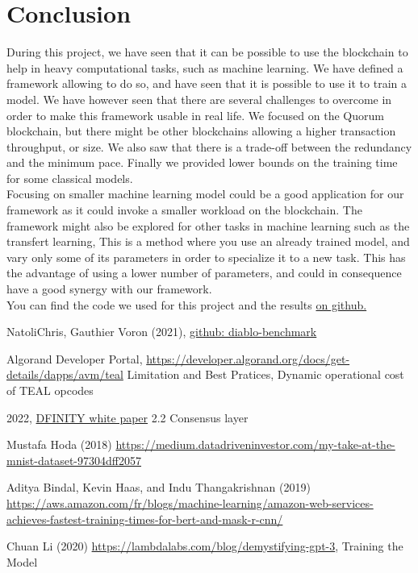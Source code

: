 \documentclass{article}
\begin{document}
\section{Conclusion}
During this project, we have seen that it can be possible to use the blockchain to help in heavy computational tasks, such as
machine learning. We have defined a framework allowing to do so, and have seen that it is possible to use it to train a model.
We have however seen that there are several challenges to overcome in order to make this framework usable in real life.
We focused on the Quorum blockchain, but there might be other blockchains allowing a higher transaction throughput, or size.
We also saw that there is a trade-off between the redundancy and the minimum pace. Finally we provided lower bounds
on the training time for some classical models.\\
Focusing on smaller machine learning model could be a good application for our framework as it could invoke a smaller workload
on the blockchain. The framework might also be explored for other tasks in machine learning such as the transfert learning, This is a method where
you use an already trained model, and vary only some of its parameters in order to specialize it to a new task. This has the
advantage of using a lower number of parameters, and could in consequence have a good synergy with our framework.\\
You can find the code we used for this project and the results \href{https://github.com/douglasbouchet/ml_on_blockchain}{on github.}


\newpage
\begin{thebibliography}{9}

    NatoliChris, Gauthier Voron (2021), \href{https://github.com/NatoliChris/diablo-benchmark/tree/develop}{github: diablo-benchmark}

    Algorand Developer Portal, \href{https://developer.algorand.org/docs/get-details/dapps/avm/teal}{https://developer.algorand.org/docs/get-details/dapps/avm/teal} Limitation and Best Pratices, Dynamic operational cost of TEAL opcodes

    2022, \href{https://internetcomputer.org/whitepaper.pdf}{DFINITY white paper} 2.2 Consensus layer

    Mustafa Hoda (2018) \href{https://medium.datadriveninvestor.com/my-take-at-the-mnist-dataset-97304dff2057}{https://medium.datadriveninvestor.com/my-take-at-the-mnist-dataset-97304dff2057}

    Aditya Bindal, Kevin Haas, and Indu Thangakrishnan (2019) \href{https://aws.amazon.com/fr/blogs/machine-learning/amazon-web-services-achieves-fastest-training-times-for-bert-and-mask-r-cnn/}{https://aws.amazon.com/fr/blogs/machine-learning/amazon-web-services-achieves-fastest-training-times-for-bert-and-mask-r-cnn/}

    Chuan Li (2020) \href{https://lambdalabs.com/blog/demystifying-gpt-3}{https://lambdalabs.com/blog/demystifying-gpt-3}, Training the Model

\end{thebibliography}
\end{document}
